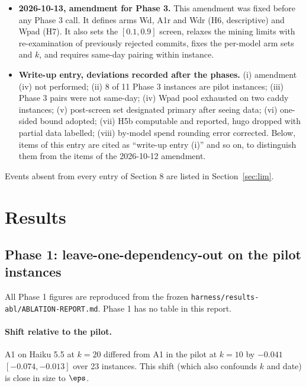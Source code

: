 \begin{itemize}
\item \textbf{2026-10-13, amendment for Phase 3.} This amendment was fixed before any Phase 3 call. It defines arms Wd, A1r and Wdr (H6, descriptive) and Wpad (H7). It also sets the $[0.1, 0.9]$ screen, relaxes the mining limits with re-examination of previously rejected commits, fixes the per-model arm sets and $k$, and requires same-day pairing within instance.
\item \textbf{Write-up entry, deviations recorded after the phases.} (i) amendment (iv) not performed; (ii) 8 of 11 Phase 3 instances are pilot instances; (iii) Phase 3 pairs were not same-day; (iv) Wpad pool exhausted on two caddy instances; (v) post-screen set designated primary after seeing data; (vi) one-sided bound adopted; (vii) H5b computable and reported, hugo dropped with partial data labelled; (viii) by-model spend rounding error corrected. Below, items of this entry are cited as ``write-up entry (i)'' and so on, to distinguish them from the items of the 2026-10-12 amendment.
\end{itemize}

Events absent from every entry of Section 8 are listed in Section~\ref{sec:lim}.

\section{Results}



\subsection{Phase 1: leave-one-dependency-out on the pilot instances}

All Phase 1 figures are reproduced from the frozen \texttt{harness/results-abl/ABLATION-REPORT.md}. Phase 1 has no table in this report.

\paragraph{Shift relative to the pilot.} A1 on Haiku 5.5 at $k=20$ differed from A1 in the pilot at $k=10$ by $-0.041$ $[-0.074, -0.013]$ over 23 instances. This shift (which also confounds $k$ and date) is close in size to $\eps$.

